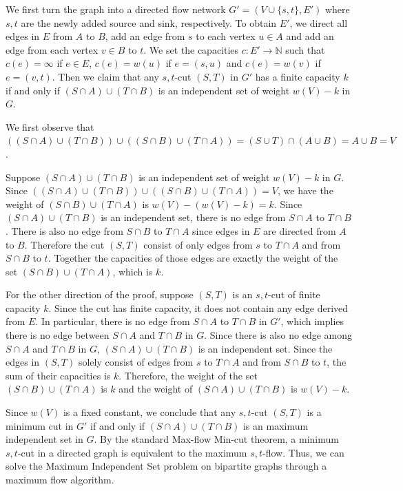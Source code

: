 \documentclass[twocolumn]{bmcart}%
\theoremstyle{mystyle}
\theoremstyle{proofstyle}
\begin{document}
We first turn the graph into a directed flow network $G' = (V \cup \{s,t\}, E')$ where $s, t$ are the newly added source and sink, respectively. To obtain $E'$, we direct all edges in $E$ from $A$ to $B$, add an edge from $s$ to each vertex $u \in A$ and add an edge from each vertex $v \in B$ to $t$. We set the capacities $c: E' \to \mathbb{N}$ such that $c(e) = \infty$ if $e \in E$, $c(e) = w(u)$ if $e = (s,u)$ and $c(e) = w(v)$ if $e = (v,t)$. Then we claim that any $s,t$-cut $(S,T)$ in $G'$ has a finite capacity $k$ if and only if $(S\cap A) \cup (T \cap B)$ is an independent set of weight $w(V) - k$ in $G$. 

We first observe that $((S \cap A) \cup (T\cap B)) \cup ((S \cap B) \cup (T \cap A)) = (S\cup T) \cap (A \cup B) = A \cup B = V$. 

Suppose $(S \cap A) \cup (T\cap B)$ is an independent set of weight $w(V) - k$ in $G$. Since $((S \cap A) \cup (T\cap B)) \cup ((S \cap B) \cup (T \cap A)) = V$, we have the weight of $(S \cap B) \cup (T \cap A)$ is $w(V)-(w(V)-k) = k$. Since $(S \cap A) \cup (T\cap B)$ is an independent set, there is no edge from $S \cap A$ to $T\cap B$. There is also no edge from $S \cap B$ to $T \cap A$ since edges in $E$ are directed from $A$ to $B$. Therefore the cut $(S,T)$ consist of only edges from $s$ to $T \cap A$ and from $S \cap B$ to $t$. Together the capacities of those edges are exactly the weight of the set $(S \cap B) \cup (T \cap A)$, which is $k$. 

For the other direction of the proof, suppose $(S,T)$ is an $s,t$-cut of finite capacity $k$. Since the cut has finite capacity, it does not contain any edge derived from $E$. In particular, there is no edge from $S \cap A$ to $T \cap B$ in $G'$, which implies there is no edge between $S\cap A$ and $T\cap B$ in $G$. Since there is also no edge among $S\cap A$ and $T\cap B$ in $G$, $(S\cap A) \cup (T \cap B)$ is an independent set. Since the edges in $(S,T)$ solely consist of edges from $s$ to $T \cap A$ and from $S \cap B$ to $t$, the sum of their capacities is $k$. Therefore, the weight of the set $(S \cap B) \cup (T \cap A)$ is $k$ and the weight of $(S\cap A) \cup (T \cap B)$ is $w(V)- k$.

Since $w(V)$ is a fixed constant, we conclude that any $s,t$-cut $(S,T)$ is a minimum cut in $G'$ if and only if $(S\cap A) \cup (T \cap B)$ is an maximum independent set in $G$. By the standard Max-flow Min-cut theorem, a minimum $s,t$-cut in a directed graph is equivalent to the maximum $s,t$-flow. Thus, we can solve the Maximum Independent Set problem on bipartite graphs through a maximum flow algorithm.
\end{document}
